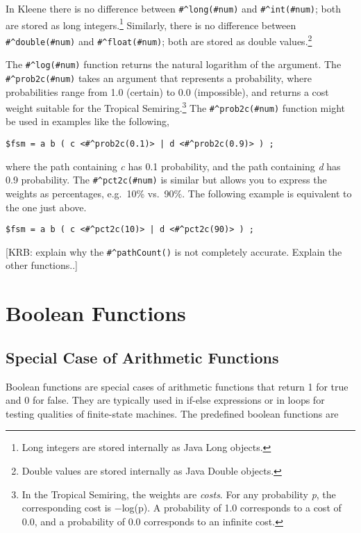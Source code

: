 \vspace{0.5cm}

In Kleene there is no difference between \verb!#^long(#num)! and
\verb!#^int(#num)!; both are stored as long integers.\footnote{Long
integers are stored internally as Java Long objects.}  Similarly, there
is no difference between \verb!#^double(#num)! and \verb!#^float(#num)!;
both are stored as double values.\footnote{Double values are stored
internally as Java Double objects.}  

The \verb!#^log(#num)! function returns the natural logarithm of the
argument.
The \verb!#^prob2c(#num)! takes an argument that represents a probability,
where probabilities range from 1.0 (certain) to 0.0 (impossible), and
returns a cost weight suitable for the Tropical Semiring.\footnote{In
	the Tropical Semiring, the weights are \emph{costs}.  For any
probability \emph{p}, the corresponding cost is $-$log(p).  A probability
of 1.0 corresponds to a cost of 0.0, and a probability of 0.0
corresponds to an infinite cost.}  The \verb!#^prob2c(#num)! function might
be used in examples like the following,

\begin{Verbatim}[fontsize=\small]
$fsm = a b ( c <#^prob2c(0.1)> | d <#^prob2c(0.9)> ) ;
\end{Verbatim}

\noindent
where the path containing \emph{c} has 0.1 probability, and the path containing
\emph{d} has 0.9 probability.  The \verb!#^pct2c(#num)! is similar but allows you
to express the weights as percentages, e.g.\ 10\% vs.\ 90\%.  The following example is equivalent to the
one just above.

\begin{Verbatim}[fontsize=\small]
$fsm = a b ( c <#^pct2c(10)> | d <#^pct2c(90)> ) ;
\end{Verbatim}


[KRB:  explain why the \verb!#^pathCount()! is not completely accurate.
Explain the other functions..]  

\section{Boolean Functions}

\subsection{Special Case of Arithmetic Functions}

Boolean functions are special cases of arithmetic functions that return 1 for true and 0 for false.  They
are typically used in if-else expressions or in loops for testing qualities of finite-state machines.
The predefined boolean functions are 

